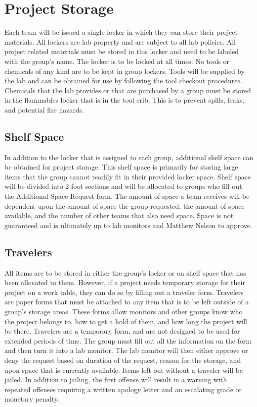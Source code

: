 \section{Project Storage}
Each team will be issued a single locker in which they can store their project materials. All lockers are lab property and are subject to all lab policies. All project related materials must be stored in this locker and need to be labeled with the group’s name. The locker is to be locked at all times. No tools or chemicals of any kind are to be kept in group lockers. Tools will be supplied by the lab and can be obtained for use by following the tool checkout procedures. Chemicals that the lab provides or that are purchased by a group must be stored in the flammables locker that is in the tool crib. This is to prevent spills, leaks, and potential fire hazards. 
\subsection{Shelf Space}
In addition to the locker that is assigned to each group, additional shelf space can be obtained for project storage. This shelf space is primarily for storing large items that the group cannot readily fit in their provided locker space. Shelf space will be divided into 2 foot sections and will be allocated to groups who fill out the Additional Space Request form. The amount of space a team receives will be dependent upon the amount of space the group requested, the amount of space available, and the number of other teams that also need space. Space is not guaranteed and is ultimately up to lab monitors and Matthew Nelson to approve.
\subsection{Travelers}
All items are to be stored in either the group’s locker or on shelf space that has been allocated to them. However, if a project needs temporary storage for their project on a work table, they can do so by filling out a traveler form. Travelers are paper forms that must be attached to any item that is to be left outside of a group’s storage areas. These forms allow monitors and other groups know who the project belongs to, how to get a hold of them, and how long the project will be there. Travelers are a temporary form, and are not designed to be used for extended periods of time. The group must fill out all the information on the form and then turn it into a lab monitor. The lab monitor will then either approve or deny the request based on duration of the request, reason for the storage, and upon space that is currently available. Items left out without a traveler will be jailed. In addition to jailing, the first offense will result in a warning with repeated offenses requiring a written apology letter and an escalating grade or monetary penalty.
